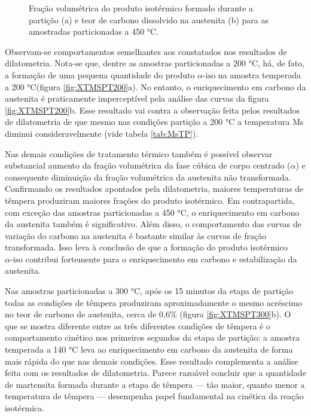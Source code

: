 \begin{figure}
	\quad
	\caption{Fração volumétrica do produto isotérmico formado durante a partição (a) e teor de carbono dissolvido na austenita (b) para as amostradas particionadas a 450 °C.}
	\label{fig:XTMSPT450}
\end{figure}

Observam-se comportamentos semelhantes aos constatados nos resultados de dilatometria. Nota-se que, dentre as amostras particionadas a 200 °C, há, de fato, a formação de uma pequena quantidade do produto $\alpha\text{-iso}$ na amostra temperada a 200 °C(figura \ref{fig:XTMSPT200}a). No entanto, o enriquecimento em carbono da austenita é praticamente imperceptível pela análise das curvas da figura \ref{fig:XTMSPT200}b. Esse resultado vai contra a observação feita pelos resultados de dilatometria de que mesmo nas condições partição a 200 °C a temperatura Ms diminui consideravelmente (vide tabela \ref{tab:MsTP}).

Nas demais condições de tratamento térmico também é possível observar substancial aumento da fração volumétrica da fase cúbica de corpo centrado ($\alpha$) e consequente diminuição da fração volumétrica da austenita não transformada. Confirmando os resultados apontados pela dilatometria, maiores temperaturas de têmpera produziram maiores frações do produto isotérmico. Em contrapartida, com exceção das amostras particionadas a 450 °C, o enriquecimento em carbono da austenita também é significativo. Além disso, o comportamento das curvas de variação do carbono na austenita é bastante similar às curvas de fração transformada. Isso leva à conclusão de que a formação do produto isotérmico $\alpha\text{-iso}$ contribui fortemente para o enriquecimento em carbono e estabilização da austenita.

Nas amostras particionadas a 300 °C, após os 15 minutos da etapa de partição todas as condições de têmpera produziram aproximadamente o mesmo acréscimo no teor de carbono de austenita, cerca de 0,6\% (figura \ref{fig:XTMSPT300}b). O que se mostra diferente entre as três diferentes condições de têmpera é o comportamento cinético nos primeiros segundos da etapa de partição: a amostra temperada a 140 °C leva ao enriquecimento em carbono da austenita de forma mais rápida do que nas demais condições. Esse resultado complementa a análise feita com os resultados de dilatometria. Parece razoável concluir que a quantidade de martensita formada durante a etapa de têmpera --- tão maior, quanto menor a temperatura de têmpera --- desempenha papel fundamental na cinética da reação isotérmica.

